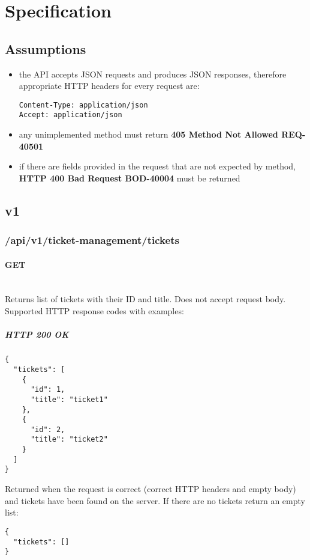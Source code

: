 \documentclass[a4paper]{article}
\newcommand{\newLineParagraph}[1]{\paragraph{#1}\mbox{}\\}
\begin{document}
    \pagebreak
    \section{Specification}

    \subsection{Assumptions}
    \begin{itemize}
        \item the API accepts JSON requests and produces JSON responses, therefore appropriate HTTP headers for every request are:
        \begin{verbatim}
Content-Type: application/json
Accept: application/json
        \end{verbatim}
        \item any unimplemented method must return \textbf{405 Method Not Allowed REQ-40501}
        \item if there are fields provided in the request that are not expected by method, \textbf{HTTP 400 Bad Request BOD-40004} must be returned
    \end{itemize}

    \subsection{v1}

    \subsubsection{/api/v1/ticket-management/tickets}

    \newLineParagraph{GET}
    Returns list of tickets with their ID and title. Does not accept request body. \\
    Supported HTTP response codes with examples:

    \subparagraph{HTTP 200 OK}
    \begin{verbatim}
{
  "tickets": [
    {
      "id": 1,
      "title": "ticket1"
    },
    {
      "id": 2,
      "title": "ticket2"
    }
  ]
}
    \end{verbatim}
    Returned when the request is correct (correct HTTP headers and empty body) and tickets have been found on the server. If there are no tickets return an empty list:
    \begin{verbatim}
{
  "tickets": []
}
    \end{verbatim}
\end{document}
